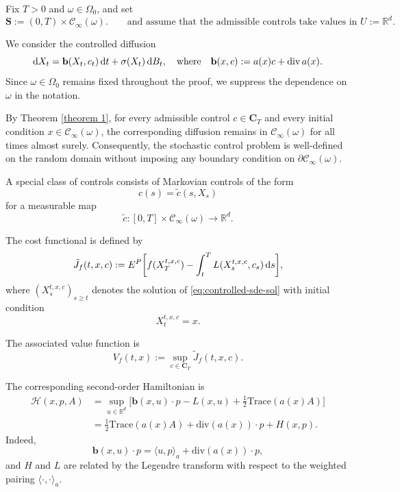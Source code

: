 \documentclass[11pt]{article}
\renewcommand{\d}{{\rm d}}
\newcommand{\R}{\mathbb R}
\theoremstyle{rem}
\begin{document}
\medskip

Fix $T>0$ and $\omega\in\Omega_0$, and set
\[
\mathbf S
:=
(0,T)\times\mathcal C_\infty(\omega). \qquad\mbox{and assume that the admissible controls take values in $U:=\R^d$.}
\]


We consider the controlled diffusion
\begin{equation}\label{eq:controlled-sde-sol}
\d X_t
=
\mathbf b(X_t,c_t)\,\d t
+
\sigma(X_t)\,\d B_t,
\quad \mbox{where}
\quad
\mathbf b(x,c)
:=
a(x)c+\mathrm{div}\,a(x).
\end{equation}
Since $\omega\in\Omega_0$ remains fixed throughout the proof, we suppress the dependence on $\omega$ in the notation.

By Theorem \ref{theorem 1}, for every admissible control
$c\in\mathbf C_T$ and every initial condition
$x\in\mathcal C_\infty(\omega)$, the corresponding diffusion remains in
$\mathcal C_\infty(\omega)$ for all times almost surely. Consequently, the stochastic control problem is well-defined on the random domain without imposing any boundary condition on
$\partial\mathcal C_\infty(\omega)$.

A special class of controls consists of Markovian controls of the form
\begin{equation}\label{Markovian control}
c(s)=\tilde c(s,X_s)
\end{equation}
for a measurable map
\[
\tilde c:[0,T]\times\mathcal C_\infty(\omega)\to\R^d.
\]

The cost functional is defined by
\begin{equation}\label{def cost}
\tilde J_f(t,x,c)
:=
E^P\bigg[
f(X_T^{t,x,c})
-
\int_t^T
L(X_s^{t,x,c},c_s)\,\d s
\bigg],
\end{equation}
where $(X_s^{t,x,c})_{s\geq t}$ denotes the solution of \eqref{eq:controlled-sde-sol} with initial condition
\[
X_t^{t,x,c}=x.
\]

The associated value function is
\begin{equation}\label{def value}
V_f(t,x)
:=
\sup_{c\in\mathbf C_T}
\tilde J_f(t,x,c).
\end{equation}

The corresponding second-order Hamiltonian is
\[
\begin{aligned}
\mathcal H(x,p,A)
&=
\sup_{u\in\R^d}
\bigg[
\mathbf b(x,u)\cdot p
-
L(x,u)
+
\frac12\mathrm{Trace}(a(x)A)
\bigg]
\\
&=
\frac12\mathrm{Trace}(a(x)A)
+
\mathrm{div}(a(x))\cdot p
+
H(x,p).
\end{aligned}
\]
Indeed,
\[
\mathbf b(x,u)\cdot p
=
\langle u,p\rangle_a
+
\mathrm{div}(a(x))\cdot p,
\]
and $H$ and $L$ are related by the Legendre transform with respect to the weighted pairing
$\langle\cdot,\cdot\rangle_a$.
\end{document}
